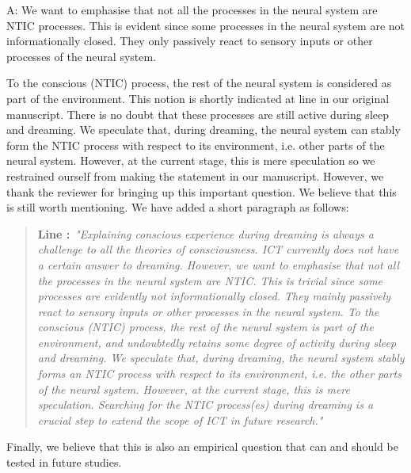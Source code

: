 \documentclass[utf8]{article}
\newenvironment{ans}  
    {\color{Black}\noindent A:}
    {~\newline}
\newcommand{\addnew}[2]{\blockcquote{}{\textbf{Line #1:}~\newline\textit{"#2"}}
}
\begin{document}
    	\begin{ans}
	    	We want to emphasise that not all the processes in the neural system are NTIC processes. This is evident since some processes in the neural system are not informationally closed. They only passively react to sensory inputs or other processes of the neural system. 
	    	
	    	To the conscious (NTIC) process, the rest of the neural system is considered as part of the environment. This notion is shortly indicated at line  in our original manuscript. There is no doubt that these processes are still active during sleep and dreaming. We speculate that, during dreaming, the neural system can stably form the NTIC process with respect to its environment, i.e. other parts of the neural system.  However, at the current stage, this is mere speculation so we restrained ourself from making the statement in our manuscript. However, we thank the reviewer for bringing up this important question. We believe that this is still worth mentioning. We have added a short paragraph as follows:
	    	
			\addnew{}{Explaining conscious experience during dreaming is always a challenge to all the theories of consciousness. ICT currently does not have a certain answer to dreaming. However, we want to emphasise that not all the processes in the neural system are NTIC. This is trivial since some processes are evidently not informationally closed. They mainly passively react to sensory inputs or other processes in the neural system. To the conscious (NTIC) process, the rest of the neural system is part of the environment, and undoubtedly retains some degree of activity during sleep and dreaming. We speculate that, during dreaming, the neural system stably forms an NTIC process with respect to its environment, i.e. the other parts of the neural system. However, at the current stage, this is mere speculation. Searching for the NTIC process(es) during dreaming is a crucial step to extend the scope of ICT in future research.}
	    	
	    	Finally, we believe that this is also an
	    	empirical question that can and should be tested in future studies.
    	\end{ans}
        
\end{document}
